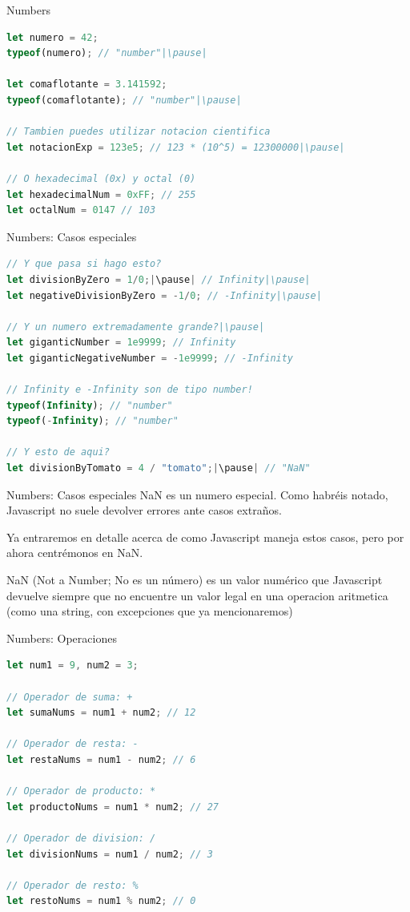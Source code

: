 \documentclass{beamer}
\begin{document}
\begin{frame}[fragile]{Numbers}
\begin{lstlisting}[language=JavaScript]
let numero = 42;
typeof(numero); // "number"|\pause|

let comaflotante = 3.141592;
typeof(comaflotante); // "number"|\pause|

// Tambien puedes utilizar notacion cientifica
let notacionExp = 123e5; // 123 * (10^5) = 12300000|\pause|

// O hexadecimal (0x) y octal (0)
let hexadecimalNum = 0xFF; // 255
let octalNum = 0147 // 103
\end{lstlisting}    
\end{frame}

\begin{frame}[fragile]{Numbers: Casos especiales}
\begin{lstlisting}[language=JavaScript]
// Y que pasa si hago esto?
let divisionByZero = 1/0;|\pause| // Infinity|\pause|
let negativeDivisionByZero = -1/0; // -Infinity|\pause|

// Y un numero extremadamente grande?|\pause|
let giganticNumber = 1e9999; // Infinity
let giganticNegativeNumber = -1e9999; // -Infinity

// Infinity e -Infinity son de tipo number!
typeof(Infinity); // "number"
typeof(-Infinity); // "number"

// Y esto de aqui?
let divisionByTomato = 4 / "tomato";|\pause| // "NaN"
\end{lstlisting}    
\end{frame}

\begin{frame}{Numbers: Casos especiales}
NaN es un numero especial. Como habréis notado, Javascript no suele devolver errores ante casos extraños.

Ya entraremos en detalle acerca de como Javascript maneja estos casos, pero por ahora centrémonos en NaN.\pause

NaN (Not a Number; No es un número) es un valor numérico que Javascript devuelve siempre que no encuentre un valor legal en una operacion aritmetica (como una string, con excepciones que ya mencionaremos)
\end{frame}

\begin{frame}[fragile]{Numbers: Operaciones}
\begin{lstlisting}[language=JavaScript]
let num1 = 9, num2 = 3;

// Operador de suma: +
let sumaNums = num1 + num2; // 12

// Operador de resta: -
let restaNums = num1 - num2; // 6

// Operador de producto: *
let productoNums = num1 * num2; // 27

// Operador de division: /
let divisionNums = num1 / num2; // 3

// Operador de resto: %
let restoNums = num1 % num2; // 0
\end{lstlisting}
\end{frame}
\end{document}
